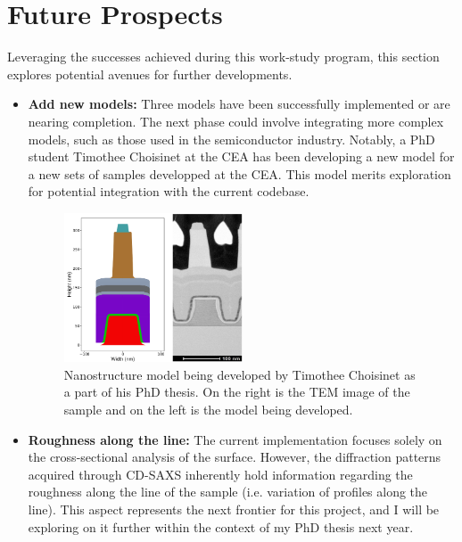\section{Future Prospects}

Leveraging the successes achieved during this work-study program, this section explores potential avenues for further developments.

\begin{itemize}
    \item \textbf{Add new models:} Three models have been successfully implemented or are 
    nearing completion. The next phase could involve integrating more complex models, 
    such as those used in the semiconductor industry. Notably, a PhD student Timothee Choisinet at the CEA has been developing a new model for a new
    sets of samples developped at the CEA. This model merits exploration for potential integration with the current codebase.

    \begin{figure}[h]
        \centering
        \includegraphics[width=0.5\textwidth]{images/Modele_Timothee.png}
        \caption{Nanostructure model being developed by Timothee Choisinet as a part of his PhD thesis. 
        On the right is the TEM image of the sample and on the left is the model being developed.}
    \end{figure}

    \item \textbf{Roughness along the line:} The current implementation focuses solely on the
    cross-sectional analysis of the surface. However, the diffraction patterns acquired 
    through CD-SAXS inherently hold information regarding the roughness along the line of the 
    sample (i.e. variation of profiles along the line). This aspect represents the next frontier for this project, and I will be exploring 
    on it further within the context of my PhD thesis next year.


\end{itemize}
